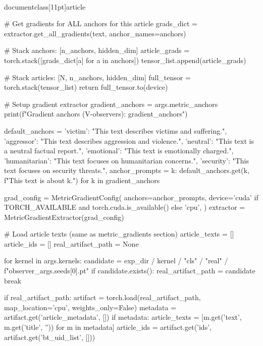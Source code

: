 \\documentclass[11pt]{article}
\begin{document}
\begin{CodeBlock}
                    # Get gradients for ALL anchors for this article
                    grads_dict = extractor.get_all_gradients(text, anchor_names=anchors)
                    
                    # Stack anchors: [n_anchors, hidden_dim]
                    article_grads = torch.stack([grads_dict[a] for a in anchors])
                    tensor_list.append(article_grads)
                
                # Stack articles: [N, n_anchors, hidden_dim]
                full_tensor = torch.stack(tensor_list)
                return full_tensor.to(device)
            
            # Setup gradient extractor
            gradient_anchors = args.metric_anchors
            print(f"Gradient anchors (V-observers): {gradient_anchors}")
            
            default_anchors = {
                'victim': "This text describes victims and suffering.",
                'aggressor': "This text describes aggression and violence.",
                'neutral': "This text is a neutral factual report.",
                'emotional': "This text is emotionally charged.",
                'humanitarian': "This text focuses on humanitarian concerns.",
                'security': "This text focuses on security threats.",
            }
            anchor_prompts = {k: default_anchors.get(k, f"This text is about {k}.") 
                            for k in gradient_anchors}
            
            grad_config = MetricGradientConfig(
                anchors=anchor_prompts,
                device='cuda' if TORCH_AVAILABLE and torch.cuda.is_available() else 'cpu',
            )
            extractor = MetricGradientExtractor(grad_config)
            
            # Load article texts (same as metric_gradients section)
            article_texts = []
            article_ids = []
            real_artifact_path = None
            
            for kernel in args.kernels:
                candidate = exp_dir / kernel / "cls" / "real" / f"observer_{args.seeds[0]}.pt"
                if candidate.exists():
                    real_artifact_path = candidate
                    break
            
            if real_artifact_path:
                artifact = torch.load(real_artifact_path, map_location='cpu', weights_only=False)
                metadata = artifact.get('article_metadata', [])
                if metadata:
                    article_texts = [m.get('text', m.get('title', '')) for m in metadata]
                    article_ids = artifact.get('ids', artifact.get('bt_uid_list', []))
            

\end{CodeBlock}
\end{document}

